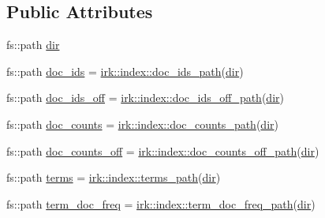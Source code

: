\subsection*{Public Attributes}
\begin{DoxyCompactItemize}
\item 
fs\+::path \mbox{\hyperlink{structirk_1_1index_1_1metadata_a355b4325c022cd152e68fc18b1775fc6}{dir}}
\item 
fs\+::path \mbox{\hyperlink{structirk_1_1index_1_1metadata_a20168da918488d66694b1da2f0542b83}{doc\+\_\+ids}} = \mbox{\hyperlink{namespaceirk_1_1index_a1680416c227181a5ab2f0b0169adb11e}{irk\+::index\+::doc\+\_\+ids\+\_\+path}}(\mbox{\hyperlink{structirk_1_1index_1_1metadata_a355b4325c022cd152e68fc18b1775fc6}{dir}})
\item 
fs\+::path \mbox{\hyperlink{structirk_1_1index_1_1metadata_a249ece1de7a87e894345d7c987609e8e}{doc\+\_\+ids\+\_\+off}} = \mbox{\hyperlink{namespaceirk_1_1index_aae22e4280b8fc44a46c81159429bf889}{irk\+::index\+::doc\+\_\+ids\+\_\+off\+\_\+path}}(\mbox{\hyperlink{structirk_1_1index_1_1metadata_a355b4325c022cd152e68fc18b1775fc6}{dir}})
\item 
fs\+::path \mbox{\hyperlink{structirk_1_1index_1_1metadata_a1c98d482a721d75186ef3695d22263ea}{doc\+\_\+counts}} = \mbox{\hyperlink{namespaceirk_1_1index_aee9cb8e5de7bc61fdc17458d5b597e04}{irk\+::index\+::doc\+\_\+counts\+\_\+path}}(\mbox{\hyperlink{structirk_1_1index_1_1metadata_a355b4325c022cd152e68fc18b1775fc6}{dir}})
\item 
fs\+::path \mbox{\hyperlink{structirk_1_1index_1_1metadata_a40270e89d8b3b63d01a2c7da3a3e3748}{doc\+\_\+counts\+\_\+off}} = \mbox{\hyperlink{namespaceirk_1_1index_a5f8f21506f18df93a60b7ff061a800df}{irk\+::index\+::doc\+\_\+counts\+\_\+off\+\_\+path}}(\mbox{\hyperlink{structirk_1_1index_1_1metadata_a355b4325c022cd152e68fc18b1775fc6}{dir}})
\item 
fs\+::path \mbox{\hyperlink{structirk_1_1index_1_1metadata_ac3c1d47e784d486a72d249cc5b7675d2}{terms}} = \mbox{\hyperlink{namespaceirk_1_1index_a003bce4c8d885ec3e8ffffd7dc53222f}{irk\+::index\+::terms\+\_\+path}}(\mbox{\hyperlink{structirk_1_1index_1_1metadata_a355b4325c022cd152e68fc18b1775fc6}{dir}})
\item 
fs\+::path \mbox{\hyperlink{structirk_1_1index_1_1metadata_a620a29ca94ec440938aa5468c96a68fa}{term\+\_\+doc\+\_\+freq}} = \mbox{\hyperlink{namespaceirk_1_1index_a616162aee34d0fe0460174bab4e8e518}{irk\+::index\+::term\+\_\+doc\+\_\+freq\+\_\+path}}(\mbox{\hyperlink{structirk_1_1index_1_1metadata_a355b4325c022cd152e68fc18b1775fc6}{dir}})

\end{DoxyCompactItemize}

